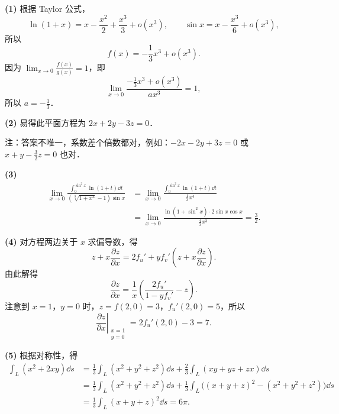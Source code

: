 \begin{solution}
  \textbf{(1)} 根据 Taylor 公式，
  \[
    \ln(1+x)=x-\frac{x^2}{2}+\frac{x^3}{3}+o(x^3),\qquad
    \sin x=x-\frac{x^3}{6}+o(x^3),
  \]
  所以
  \[
    f(x)=-\frac{1}{3}x^3+o(x^3).
  \]
  因为 $\displaystyle \lim_{x\to 0}\frac{f(x)}{g(x)}=1$，即
  \[
    \lim_{x\to 0}\frac{-\frac{1}{3}x^3+o(x^3)}{ax^3}=1,
  \]
  所以 $a=-\frac{1}{3}$．

  \textbf{(2)} 易得此平面方程为 $2x+2y-3z=0$．

  注：答案不唯一，系数差个倍数都对，例如：$-2x-2y+3z=0$ 或 $x+y-\frac{3}{2}z=0$ 也对．

  \textbf{(3)}
  \begin{align*}
    \lim_{x\to 0}\frac{\displaystyle\int_0^{\sin^2 x}\ln(1+t)\dd t}{(\sqrt[3]{1+x^3}-1)\sin x}
    &=\lim_{x\to 0}\frac{\displaystyle\int_0^{\sin^2 x}\ln(1+t)\dd t}{\frac{1}{3}x^4}\\
    &=\lim_{x\to 0}\frac{\ln(1+\sin^2 x)\cdot 2\sin x\cos x}{\frac{4}{3}x^3}
    =\frac{3}{2}.
  \end{align*}

  \textbf{(4)} 对方程两边关于 $x$ 求偏导数，得
  \[
    z+x\frac{\partial z}{\partial x}=2f_u'+yf_v'\left(z+x\frac{\partial z}{\partial x}\right).
  \]
  由此解得
  \[
    \frac{\partial z}{\partial x}=\frac{1}{x}\left(\frac{2f_u'}{1-yf_v'}-z\right).
  \]
  注意到 $x=1$，$y=0$ 时，$z=f(2,0)=3$，$f_u'(2,0)=5$，所以
  \[
    \left.\frac{\partial z}{\partial x}\right|_{\substack{x=1\\ y=0}}=2f_u'(2,0)-3=7.
  \]

  \textbf{(5)} 根据对称性，得
  \begin{align*}
    \int_L (x^2+2xy)\dd s
    &=\frac{1}{3}\int_L (x^2+y^2+z^2)\dd s+\frac{2}{3}\int_L (xy+yz+zx)\dd s\\
    &=\frac{1}{3}\int_L (x^2+y^2+z^2)\dd s
      +\frac{1}{3}\int_L \bigl((x+y+z)^2-(x^2+y^2+z^2)\bigr)\dd s\\
    &=\frac{1}{3}\int_L (x+y+z)^2\dd s=6\pi.
  \end{align*}
\end{solution}

